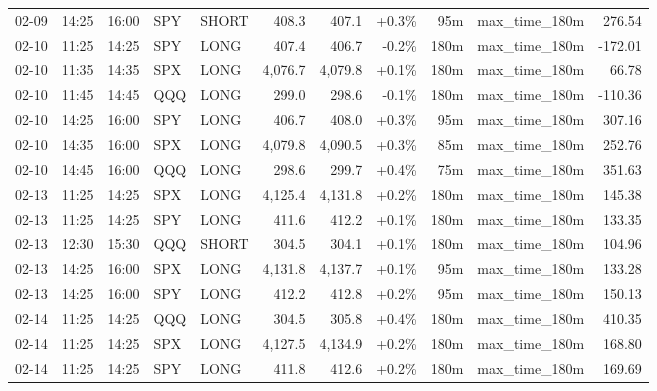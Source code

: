 \documentclass[11pt,a4paper,twoside]{article}
\begin{document}
\begin{center}
\begin{longtable}{>{\color{txtmain}}l l l l l r r r r >{\color{txtmain}}l r}
02-09 & 14:25 & 16:00 & SPY & SHORT & 408.3 & 407.1 & \textcolor{wingreen}{+0.3\%} & 95m & max\_time\_180m & \textcolor{wingreen}{276.54} \\
02-10 & 11:25 & 14:25 & SPY & LONG & 407.4 & 406.7 & \textcolor{lossred}{-0.2\%} & 180m & max\_time\_180m & \textcolor{lossred}{-172.01} \\
02-10 & 11:35 & 14:35 & SPX & LONG & 4,076.7 & 4,079.8 & \textcolor{wingreen}{+0.1\%} & 180m & max\_time\_180m & \textcolor{wingreen}{66.78} \\
02-10 & 11:45 & 14:45 & QQQ & LONG & 299.0 & 298.6 & \textcolor{lossred}{-0.1\%} & 180m & max\_time\_180m & \textcolor{lossred}{-110.36} \\
02-10 & 14:25 & 16:00 & SPY & LONG & 406.7 & 408.0 & \textcolor{wingreen}{+0.3\%} & 95m & max\_time\_180m & \textcolor{wingreen}{307.16} \\
02-10 & 14:35 & 16:00 & SPX & LONG & 4,079.8 & 4,090.5 & \textcolor{wingreen}{+0.3\%} & 85m & max\_time\_180m & \textcolor{wingreen}{252.76} \\
02-10 & 14:45 & 16:00 & QQQ & LONG & 298.6 & 299.7 & \textcolor{wingreen}{+0.4\%} & 75m & max\_time\_180m & \textcolor{wingreen}{351.63} \\
02-13 & 11:25 & 14:25 & SPX & LONG & 4,125.4 & 4,131.8 & \textcolor{wingreen}{+0.2\%} & 180m & max\_time\_180m & \textcolor{wingreen}{145.38} \\
02-13 & 11:25 & 14:25 & SPY & LONG & 411.6 & 412.2 & \textcolor{wingreen}{+0.1\%} & 180m & max\_time\_180m & \textcolor{wingreen}{133.35} \\
02-13 & 12:30 & 15:30 & QQQ & SHORT & 304.5 & 304.1 & \textcolor{wingreen}{+0.1\%} & 180m & max\_time\_180m & \textcolor{wingreen}{104.96} \\
02-13 & 14:25 & 16:00 & SPX & LONG & 4,131.8 & 4,137.7 & \textcolor{wingreen}{+0.1\%} & 95m & max\_time\_180m & \textcolor{wingreen}{133.28} \\
02-13 & 14:25 & 16:00 & SPY & LONG & 412.2 & 412.8 & \textcolor{wingreen}{+0.2\%} & 95m & max\_time\_180m & \textcolor{wingreen}{150.13} \\
02-14 & 11:25 & 14:25 & QQQ & LONG & 304.5 & 305.8 & \textcolor{wingreen}{+0.4\%} & 180m & max\_time\_180m & \textcolor{wingreen}{410.35} \\
02-14 & 11:25 & 14:25 & SPX & LONG & 4,127.5 & 4,134.9 & \textcolor{wingreen}{+0.2\%} & 180m & max\_time\_180m & \textcolor{wingreen}{168.80} \\
02-14 & 11:25 & 14:25 & SPY & LONG & 411.8 & 412.6 & \textcolor{wingreen}{+0.2\%} & 180m & max\_time\_180m & \textcolor{wingreen}{169.69} \\

\end{longtable}
\end{center}
\end{document}
